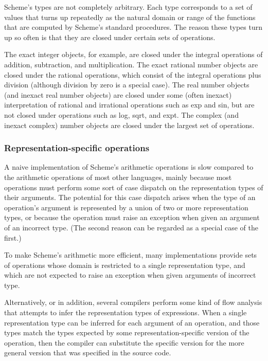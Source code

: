 \documentclass[twoside,twocolumn]{algol60}
\begin{document}
Scheme's types are not completely arbitrary.  Each type corresponds to
a set of values that turns up repeatedly as the natural domain or
range of the functions that are computed by Scheme's standard
procedures.  The reason these types turn up so often is that they are
closed under certain sets of operations.

The exact integer objects, for example, are closed under the integral
operations of addition, subtraction, and multiplication.  The exact
rational number objects are closed under the rational operations, which consist of
the integral operations plus division (although division by zero is a special
case).  The real number objects (and inexact real number objects) are closed
under some (often inexact) interpretation of rational and irrational
operations such as exp and sin, but are not closed under operations
such as {\cf log}, {\cf sqrt}, and {\cf expt}.  The complex (and
inexact complex) number objects are closed under the largest set of
operations.

\subsubsection{Representation-specific operations}

A naive implementation of Scheme's arithmetic operations is slow
compared to the arithmetic operations of most other languages, mainly
because most operations must perform some sort of case dispatch on the
representation types of their arguments.  The potential for this case
dispatch arises when the type of an operation's argument is
represented by a union of two or more representation types, or because
the operation must raise an exception when given an argument of
an incorrect type.  (The second reason can be regarded as a special
case of the first.)

To make Scheme's arithmetic more efficient, many implementations
provide sets of operations whose domain is restricted to a single
representation type, and which are not expected to raise an exception
when given arguments of incorrect type.

Alternatively, or in addition, several compilers perform some kind of
flow analysis that attempts to infer the representation types of
expressions.  When a single representation type can be inferred for
each argument of an operation, and those types match the types
expected by some representation-specific version of the operation,
then the compiler can substitute the specific version for the more
general version that was specified in the source code.
\end{document}
